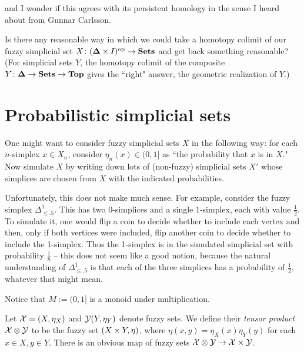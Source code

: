 \documentclass{amsart}
\def\bD{{\bf \Delta}}
\begin{document}
\begin{question} and I wonder if this agrees with its persistent homology in the sense I heard about from Gunnar Carlsson.
\end{question}

\begin{question}
Is there any reasonable way in which we could take a homotopy colimit of our fuzzy simplicial set $X\taking(\bD\cross I)\op\to\Sets$ and get back something reasonable? (For simplicial sets $Y$, the homotopy colimit of the composite $Y\taking\bD\to\Sets\to\Top$ gives the ``right" answer, the geometric realization of $Y$.)
\end{question}



\appendix

\section{Probabilistic simplicial sets}

One might want to consider fuzzy simplicial sets $X$ in the following way: for each $n$-simplex $x\in X_n$, consider $\eta_n(x)\in(0,1]$ as ``the probability that $x$ is in $X$."  Now simulate $X$ by writing down lots of (non-fuzzy) simplicial sets $X'$ whose simplices are chosen from $X$ with the indicated probabilities.

Unfortunately, this does not make much sense.  For example, consider the fuzzy simplex $\Delta^1_{\leq .5}$.  This has two 0-simplices and a single 1-simplex, each with value $\frac{1}{2}$.  To simulate it, one would flip a coin to decide whether to include each vertex and then, only if both vertices were included, flip another coin to decide whether to include the 1-simplex.  Thus the 1-simplex is in the simulated simplicial set with probability $\frac{1}{8}$ -- this does not seem like a good notion, because the natural understanding of $\Delta^1_{\leq .5}$ is that each of the three simplices has a probability of $\frac{1}{2}$, whatever that might mean.

Notice that $M:=(0,1]$ is a monoid under multiplication. 

\begin{definition}

Let $\mathcal{X}=(X,\eta_X)$ and $\mathcal{Y}(Y,\eta_Y)$ denote fuzzy sets.  We define their {\em tensor product} $\mathcal{X}\otimes\mathcal{Y}$ to be the fuzzy set $(X\times Y,\eta)$, where $\eta(x,y)=\eta_X(x)\eta_Y\!(y)$ for each $x\in X, y\in Y$.  There is an obvious map of fuzzy sets $\mathcal{X}\otimes\mathcal{Y}\rightarrow\mathcal{X}\times\mathcal{Y}$.

\end{definition}
\end{document}
